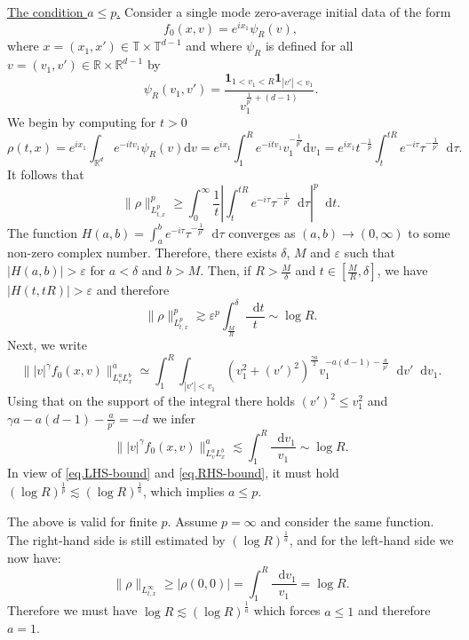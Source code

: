 \documentclass[11pt,a4paper,reqno]{amsart}
\theoremstyle{plain}
\theoremstyle{remark}
\newcommand{\dd}{\mathop{}\!\mathrm{d}}
\begin{document}
\medskip
\noindent\underline{The condition $a\leq p$.}
Consider a single mode zero-average initial data of the form 
\[
    f_0(x,v)=e^{ix_1}\psi_R(v),
\]
where $x=(x_1,x')\in \mathbb{T} \times \mathbb{T}^{d-1}$ and where $\psi_R$ is defined for all $v=(v_1,v') \in \mathbb{R} \times\mathbb{R}^{d-1}$ by 
\[
    \psi_R(v_1,v') = \frac{\mathbf{1}_{1<v_1<R}\mathbf{1}_{|v'|<v_1}}{v_1^{\frac{1}{p'}+(d-1)}}.
\]
We begin by computing for $t >0$
\[
    \rho(t,x)=e^{ix_1}\int_{\mathbb{R}^d} e^{-itv_1}\psi_R(v)\mathrm{d}v = e^{ix_1}\int_{1}^R e^{-itv_1}v_1^{-\frac{1}{p'}}\mathrm{d}v_1 = e^{ix_1}t^{-\frac{1}{p}}\int_{t}^{tR}e^{-i\tau}\tau^{-\frac{1}{p'}}\dd \tau.
\]
It follows that
\[
    \|\rho\|_{L^p_{t,x}}^p \geq \int_{0}^{\infty} \frac{1}{t} \left\vert \int_{t}^{tR}e^{-i\tau}\tau^{-\frac{1}{p'}}\dd \tau \right\vert^p \dd t.
\]
The function $H(a,b)= \int_{a}^{b}e^{-i\tau}\tau^{-\frac{1}{p'}}\dd \tau$ converges as $(a,b) \to (0,\infty)$ to some non-zero complex number. Therefore, there exists $\delta$, $M$ and $\varepsilon$ such that $|H(a,b)|>\varepsilon$ for $a < \delta$ and $b>M$. Then, if $R>\frac M \delta$ and $t \in [\frac{M}{R},\delta ]$, we have $|H(t,tR)|>\varepsilon$ and therefore
\begin{equation}
    \label{eq.LHS-bound}
    \|\rho\|_{L^p_{t,x}}^p \gtrsim \varepsilon^p\int_{\frac{M}{R}}^{\delta} \frac{\dd t}{t} \sim \log R. 
\end{equation}
Next, we write 
\[
    \||v|^{\gamma}f_0(x,v)\|_{L^a_vL^{b}_x}^a \simeq \int_{1}^R\int_{|v'|<v_1} (v_1^2+(v')^2)^{\frac{\gamma a}{2}}v_1^{-a(d-1)-\frac{a}{p'}} \dd v' \dd v_1.
\]
Using that on the support of the integral there holds $(v')^2 \leq v_1^2$ and $\gamma a - a(d-1)-\frac{a}{p'} = -d$ we infer 
\begin{equation}
    \label{eq.RHS-bound}
     \||v|^{\gamma}f_0(x,v)\|_{L^a_vL^{b}_x}^a \lesssim \int_1^R \frac{\dd v_1}{v_1} \sim \log R.
\end{equation}
In view of \eqref{eq.LHS-bound} and \eqref{eq.RHS-bound}, it must hold $(\log R)^{\frac{1}{p}} \lesssim (\log R)^{\frac{1}{a}}$, which implies $a \leq p$.

The above is valid for finite $p$. Assume $p=\infty$ and consider the same function. The right-hand side is still estimated by $(\log R)^{\frac{1}{a}}$, and for the left-hand side we now have: 
\[
    \|\rho\|_{L^{\infty}_{t,x}} \geq |\rho(0,0)|=\int_1^R \frac{\dd v_1}{v_1} = \log R.
\]
Therefore we must have $\log R \lesssim (\log R)^{\frac{1}{a}}$ which forces $a\leq 1$ and therefore $a=1$.
\end{document}
